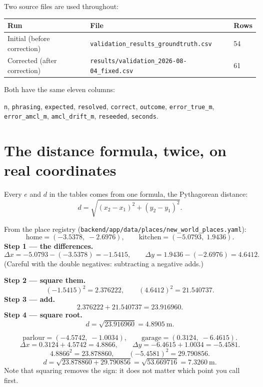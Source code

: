 \documentclass[11pt,a4paper]{report}
\newcommand{\file}[1]{\texttt{\small #1}}
\begin{document}
Two source files are used throughout:

\begin{center}
\small
\begin{tabular}{@{}lll@{}}
\toprule
\textbf{Run} & \textbf{File} & \textbf{Rows} \\
\midrule
Initial (before correction)   & \file{validation\_results\_groundtruth.csv} & 54 \\
Corrected (after correction)  & \file{results/validation\_2026-08-04\_fixed.csv} & 61 \\
\bottomrule
\end{tabular}
\end{center}

Both have the same eleven columns:
\begin{center}
\file{n}, \file{phrasing}, \file{expected}, \file{resolved}, \file{correct},
\file{outcome}, \file{error\_true\_m}, \file{error\_amcl\_m},
\file{amcl\_drift\_m}, \file{reseeded}, \file{seconds}.
\end{center}

\section{The distance formula, twice, on real coordinates}

Every $e$ and $d$ in the tables comes from one formula, the Pythagorean
distance:
\[
d = \sqrt{(x_2 - x_1)^2 + (y_2 - y_1)^2}.
\]

\begin{handbox}
From the place registry (\file{backend/app/data/places/new\_world\_places.yaml}):
\[
\text{home} = (-3.5378,\; -2.6976), \qquad
\text{kitchen} = (-5.0793,\; 1.9436).
\]
\textbf{Step 1 --- the differences.}
\[
\Delta x = -5.0793 - (-3.5378) = -1.5415,
\qquad
\Delta y = 1.9436 - (-2.6976) = 4.6412 .
\]
(Careful with the double negatives: subtracting a negative adds.)

\textbf{Step 2 --- square them.}
\[
(-1.5415)^2 = 2.376222, \qquad (4.6412)^2 = 21.540737 .
\]
\textbf{Step 3 --- add.}
\[
2.376222 + 21.540737 = 23.916960 .
\]
\textbf{Step 4 --- square root.}
\[
d = \sqrt{23.916960} = \SI{4.8905}{\metre}.
\]
\end{handbox}

\begin{handbox}
\[
\text{parlour} = (-4.5742,\; -1.0034), \qquad
\text{garage} = (0.3124,\; -6.4615).
\]
\[
\Delta x = 0.3124 + 4.5742 = 4.8866, \qquad
\Delta y = -6.4615 + 1.0034 = -5.4581 .
\]
\[
4.8866^2 = 23.878860, \qquad (-5.4581)^2 = 29.790856 .
\]
\[
d = \sqrt{23.878860 + 29.790856} = \sqrt{53.669716} = \SI{7.3260}{\metre}.
\]
Note that squaring removes the sign: it does not matter which point you call
first.
\end{handbox}
\end{document}

